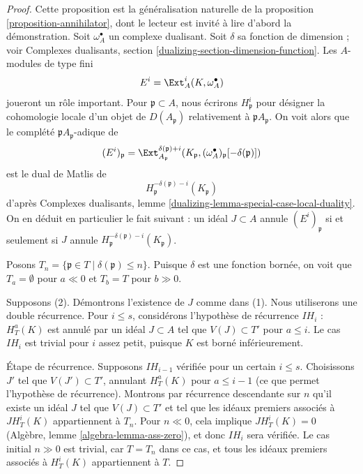 \begin{proof}
Cette proposition est la généralisation naturelle de la proposition \ref{proposition-annihilator}, dont le lecteur est invité à lire d'abord la démonstration. Soit $\omega_A^\bullet$ un complexe dualisant. Soit $\delta$ sa fonction de dimension ; voir Complexes dualisants, section \ref{dualizing-section-dimension-function}. Les $A$-modules de type fini
$$
E^i = \Ext_A^i(K, \omega_A^\bullet)
$$
joueront un rôle important. Pour $\mathfrak p \subset A$, nous écrirons $H^i_\mathfrak p$ pour désigner la cohomologie locale d'un objet de $D(A_\mathfrak p)$ relativement à $\mathfrak pA_\mathfrak p$. On voit alors que le complété $\mathfrak pA_\mathfrak p$-adique de
$$
(E^i)_\mathfrak p =
\Ext^{\delta(\mathfrak p) + i}_{A_\mathfrak p}(K_\mathfrak p,
(\omega_A^\bullet)_\mathfrak p[-\delta(\mathfrak p)])
$$
est le dual de Matlis de
$$
H^{-\delta(\mathfrak p) - i}_{\mathfrak p}(K_\mathfrak p)
$$
d'après Complexes dualisants, lemme \ref{dualizing-lemma-special-case-local-duality}. On en déduit en particulier le fait suivant : un idéal $J \subset A$ annule $(E^i)_\mathfrak p$ si et seulement si $J$ annule $H^{-\delta(\mathfrak p) - i}_{\mathfrak p}(K_\mathfrak p)$.

\medskip\noindent
Posons $T_n = \{\mathfrak p \in T \mid \delta(\mathfrak p) \leq n\}$. Puisque $\delta$ est une fonction bornée, on voit que $T_a = \emptyset$ pour $a \ll 0$ et $T_b = T$ pour $b \gg 0$.

\medskip\noindent
Supposons (2). Démontrons l'existence de $J$ comme dans (1). Nous utiliserons une double récurrence. Pour $i \leq s$, considérons l'hypothèse de récurrence $IH_i$ : $H^a_T(K)$ est annulé par un idéal $J \subset A$ tel que $V(J) \subset T'$ pour $a \leq i$. Le cas $IH_i$ est trivial pour $i$ assez petit, puisque $K$ est borné inférieurement.

\medskip\noindent
Étape de récurrence. Supposons $IH_{i - 1}$ vérifiée pour un certain $i \leq s$. Choisissons $J'$ tel que $V(J') \subset T'$, annulant $H^a_T(K)$ pour $a \leq i - 1$ (ce que permet l'hypothèse de récurrence). Montrons par récurrence descendante sur $n$ qu'il existe un idéal $J$ tel que $V(J) \subset T'$ et tel que les idéaux premiers associés à $J H^i_T(K)$ appartiennent à $T_n$. Pour $n \ll 0$, cela implique $JH^i_T(K) = 0$ (Algèbre, lemme \ref{algebra-lemma-ass-zero}), et donc $IH_i$ sera vérifiée. Le cas initial $n \gg 0$ est trivial, car $T = T_n$ dans ce cas, et tous les idéaux premiers associés à $H^i_T(K)$ appartiennent à $T$.


\end{proof}
